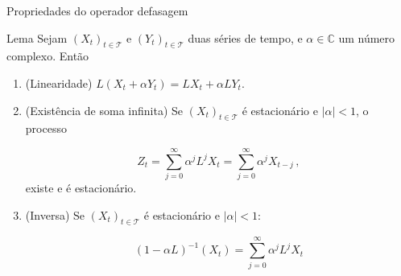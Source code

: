\documentclass[11pt]{beamer}
\begin{document}
	\begin{frame}{Propriedades do operador defasagem}
		\begin{block}{Lema}
			Sejam $(X_t)_{t \in \mathcal{T}}$ e $(Y_t)_{t \in \mathcal{T}}$ duas séries de tempo, e $\alpha \in \mathbb{C}$ um número complexo. Então
			\begin{enumerate}
				\item (Linearidade) $L(X_t+\alpha Y_t) =LX_t + \alpha LY_t$.
				\item (Existência de soma infinita) Se $(X_t)_{t \in \mathcal{T}}$ é estacionário e  $|\alpha|<1$, o processo
				
				$$Z_t= \sum_{j=0}^{\infty} \alpha^j L^j X_{t} = \sum_{j=0}^{\infty} \alpha^j X_{t-j}\, ,$$
				existe e é estacionário.
				\item (Inversa) Se $(X_t)_{t \in \mathcal{T}}$ é estacionário e  $|\alpha|<1$:
				
				$$(1-\alpha L)^{-1}(X_t) = \sum_{j=0}^{\infty} \alpha^j L^j X_t$$
			\end{enumerate}
		\end{block}
	\end{frame}
\end{document}
